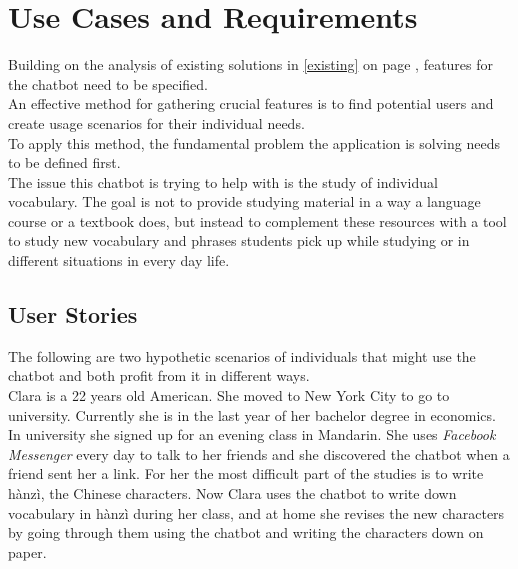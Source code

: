 \section{Use Cases and Requirements}


Building on the analysis of existing solutions in \ref{existing} on page \pageref{existing}, features for the chatbot need to be specified.
\\
An effective method for gathering crucial features is to find potential users
and create usage scenarios for their individual needs.
\\

To apply this method, the fundamental problem the application is solving needs to be defined first.
\\

The issue this chatbot is trying to help with is the study of individual vocabulary.
The goal is not to provide studying material in a way a language course or a textbook does,
but instead to complement these resources with a tool to study new vocabulary and phrases students pick up
while studying or in different situations in every day life.
\\


\subsection{User Stories}

The following are two hypothetic scenarios of individuals that might use the chatbot and both profit from it in different ways.
\\

Clara is a 22 years old American.
She moved to New York City to go to university.
Currently she is in the last year of her bachelor degree in economics.
In university she signed up for an evening class in Mandarin.
She uses \emph{Facebook Messenger} every day to talk to her friends and she discovered the chatbot when a friend sent her a link.
For her the most difficult part of the studies is to write hànzì, the Chinese characters.
Now Clara uses the chatbot to write down vocabulary in hànzì during her class,
and at home she revises the new characters by going through them using the chatbot and writing the characters
down on paper.
\\

